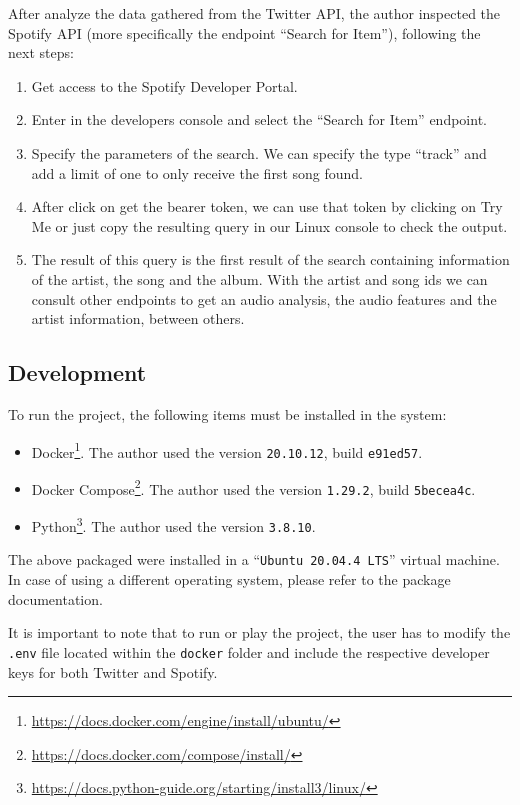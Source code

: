 \nonzeroparskip After analyze the data gathered from the Twitter API,  the author inspected the Spotify API (more specifically the endpoint ``Search for Item''), following the next steps:
\begin{enumerate}
	\item Get access to the Spotify Developer Portal.
	\item Enter in the developers console and select the ``Search for Item'' endpoint.
	\item Specify the parameters of the search. We can specify the type ``track'' and add a limit of one to only receive the first song found.
	\item After click on get the bearer token, we can use that token by clicking on Try Me or just copy the resulting query in our Linux console to check the output.
	\item The result of this query is the first result of the search containing information of the artist, the song and the album. With the artist and song ids we can consult other endpoints to get an audio analysis, the audio features and the artist information, between others.
\end{enumerate}

\subsection{Development} \label{programmer_development}
\nonzeroparskip To run the project, the following items must be installed in the system:
\begin{itemize}
	\item Docker\footnote{\url{https://docs.docker.com/engine/install/ubuntu/}}. The author used the version \texttt{20.10.12}, build \texttt{e91ed57}.
	\item Docker Compose\footnote{\url{https://docs.docker.com/compose/install/}}. The author used the version \texttt{1.29.2}, build \texttt{5becea4c}.
	\item Python\footnote{\url{https://docs.python-guide.org/starting/install3/linux/}}. The author used the version \texttt{3.8.10}.
\end{itemize}

\nonzeroparskip The above packaged were installed in a ``\texttt{Ubuntu 20.04.4 LTS}'' virtual machine. In case of using a different operating system, please refer to the package documentation.

\nonzeroparskip It is important to note that to run or play the project, the user has to modify the \texttt{.env} file located within the \texttt{docker} folder and include the respective developer keys for both Twitter and Spotify.

